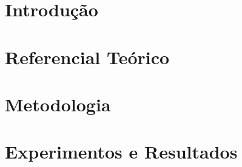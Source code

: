 \documentclass[
	12pt,				%
	openright,			%
	oneside,			%
	a4paper,			%
	chapter=TITLE,		%
	english,			%
	french,				%
	spanish,			%
	brazil				%
	]{abntex2}
\newif\ifisTipoDocumento
\begin{document}
\tableofcontents*
\cleardoublepage


\textual

\chapter[Introdução]{Introdução}



\chapter{Referencial Teórico}
\label{Cap02:Referencial_Teorico}



\ifisTipoDocumento
    \chapter[Metodologia e etapas de desenvolvimento]{Metodologia e etapas de desenvolvimento}
    
    
\else
    \chapter[Metodologia]{Metodologia}
    
\fi


\ifisTipoDocumento
    \chapter[Alocação de Recursos]{Alocação de Recursos}
    
\else
    \chapter[Experimentos e Resultados]{Experimentos e Resultados}
    
\fi
\end{document}
